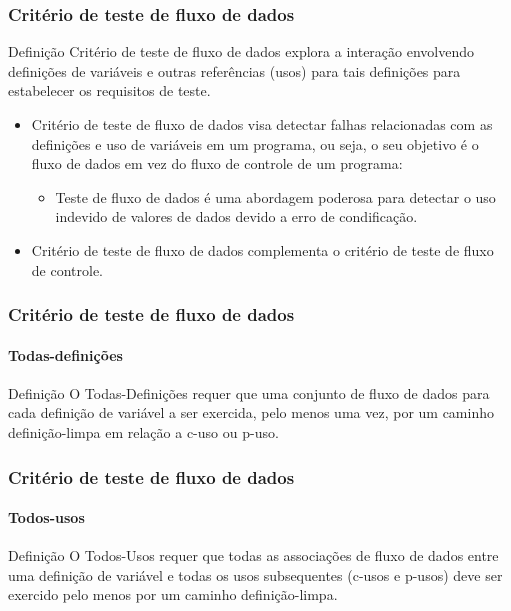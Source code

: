 \begin{frame}[parent={cmap:structural-software-testing},hasnext=true,hasprev=true]
\frametitle{Critério de teste de fluxo de dados}
\label{concept:data-flow-test}
\label{concept:data-flow-test-criterion}

\begin{block:concept}{Definição}
Critério de teste de fluxo de dados explora a interação envolvendo definições de
variáveis e outras referências (usos) para tais definições para estabelecer os
requisitos de teste.
\end{block:concept}


\begin{block:fact}{}
\begin{itemize}
    \item Critério de teste de fluxo de dados visa detectar falhas relacionadas com
	as definições e uso de variáveis em um programa, ou seja, o seu objetivo é o
	fluxo de dados em vez do fluxo de controle de um programa:
	\begin{itemize}
		\item Teste de fluxo de dados é uma abordagem poderosa para detectar o uso indevido
		de valores de dados devido a erro de condificação.
	\end{itemize}

	\item Critério de teste de fluxo de dados complementa o critério de teste de fluxo de controle.
\end{itemize}
\end{block:fact}
\end{frame}



\begin{frame}
\frametitle{Critério de teste de fluxo de dados}
\framesubtitle{Todas-definições}
\label{concept:all-defs}
\label{concept:all-defs-criterion}

\begin{block:concept}{Definição}
O Todas-Definições requer que uma conjunto de fluxo de dados para cada definição
de variável a ser exercida, pelo menos uma vez, por um caminho definição-limpa em
relação a c-uso ou p-uso.
\end{block:concept}
\end{frame}


\begin{frame}
\label{concept:all-uses}
\label{concept:all-uses-criterion}
\frametitle{Critério de teste de fluxo de dados}
\framesubtitle{Todos-usos}

\begin{block:concept}{Definição}
O Todos-Usos requer que todas as associações de fluxo de dados entre uma
definição de variável e todas os usos subsequentes (c-usos e p-usos) deve ser
exercido pelo menos por um caminho definição-limpa.
\end{block:concept}

\hfill
{}

\end{frame}




